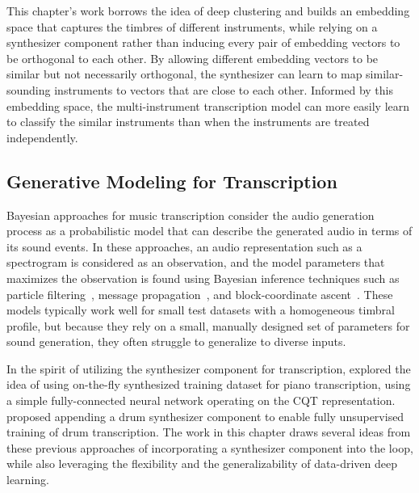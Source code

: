 This chapter's work borrows the idea of deep clustering and builds an embedding space that captures the timbres of different instruments, while relying on a synthesizer component rather than inducing every pair of embedding vectors to be orthogonal to each other.
By allowing different embedding vectors to be similar but not necessarily orthogonal, the synthesizer can learn to map similar-sounding instruments to vectors that are close to each other.
Informed by this embedding space, the multi-instrument transcription model can more easily learn to classify the similar instruments than when the instruments are treated independently.



\subsection{Generative Modeling for Transcription}

Bayesian approaches for music transcription consider the audio generation process as a probabilistic model that can describe the generated audio in terms of its sound events.
In these approaches, an audio representation such as a spectrogram is considered as an observation, and the model parameters that maximizes the observation is found using Bayesian inference techniques such as particle filtering~\cite{dubois2005harmonic}, message propagation~\cite{cemgil2006generative}, and block-coordinate ascent~\cite{bergkirkpatrick2014unsupervised}.
These models typically work well for small test datasets with a homogeneous timbral profile, but because they rely on a small, manually designed set of parameters for sound generation, they often struggle to generalize to diverse inputs.

In the spirit of utilizing the synthesizer component for transcription,
 explored the idea of using on-the-fly synthesized training dataset for piano transcription, using a simple fully-connected neural network operating on the CQT representation.
 proposed appending a drum synthesizer component to enable fully unsupervised training of drum transcription.
The work in this chapter draws several ideas from these previous approaches of incorporating a synthesizer component into the loop, while also leveraging the flexibility and the generalizability of data-driven deep learning.

